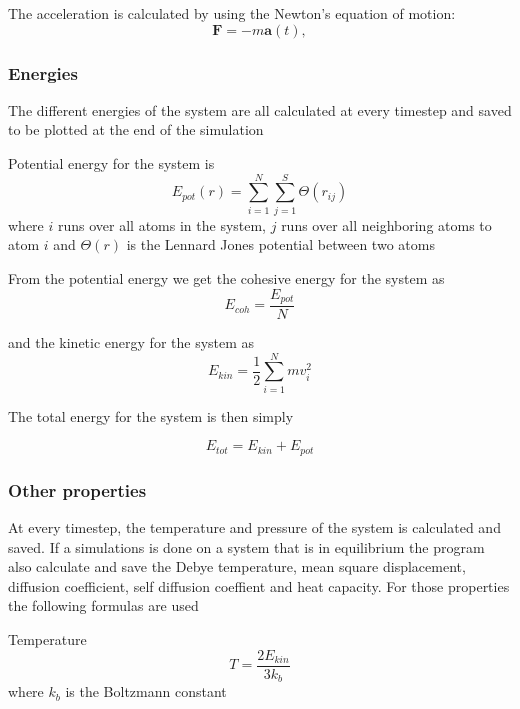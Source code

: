 \documentclass[12pt,a4paper]{article}
\begin{document}
The acceleration is calculated by using the Newton's equation of motion:
\begin{equation}
\label{eq:acceleration}
\mathbf F = -m\mathbf a(t),
\end{equation}


\subsubsection{Energies}
The different energies of the system are all calculated at every timestep and saved to be plotted at the end of the simulation

Potential energy for the system is 
\begin{equation}
E_{pot}(r)=\sum_{i=1}^N \sum_{j=1}^S \Theta(r_{ij})
\end{equation}
where \(i\) runs over all atoms in the system, \(j\) runs over all neighboring atoms to atom \(i\) and \( \Theta(r)\) is the Lennard Jones potential between two atoms 

From the potential energy we get the cohesive energy for the system as
\begin{equation}
\label{eq:Ecoh}
E_{coh}=\frac{E_{pot}} N
\end{equation}

and the kinetic energy for the system as
\begin{equation}
\label{eq:Ekin}
E_{kin}=\frac{1}2 \sum_{i=1}^N mv_i^2
\end{equation}

The total energy for the system is then simply

\begin{equation}
E_{tot} = E_{kin} + E_{pot}
\end{equation}

\subsubsection{Other properties}
At every timestep, the temperature and pressure of the system is calculated and saved. If a simulations is done on a system that is in equilibrium the program also calculate and save the Debye temperature, mean square displacement, diffusion coefficient, self diffusion coeffient and heat capacity. For those properties the following formulas are used

Temperature
\begin{equation}
\label{eq:temperature}
T=\frac{2E_{kin}}{3k_b}
\end{equation}
where \(k_b\) is the Boltzmann constant
\end{document}

